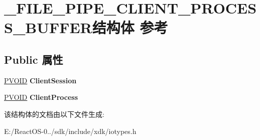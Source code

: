 \hypertarget{struct___f_i_l_e___p_i_p_e___c_l_i_e_n_t___p_r_o_c_e_s_s___b_u_f_f_e_r}{}\section{\+\_\+\+F\+I\+L\+E\+\_\+\+P\+I\+P\+E\+\_\+\+C\+L\+I\+E\+N\+T\+\_\+\+P\+R\+O\+C\+E\+S\+S\+\_\+\+B\+U\+F\+F\+E\+R结构体 参考}
\label{struct___f_i_l_e___p_i_p_e___c_l_i_e_n_t___p_r_o_c_e_s_s___b_u_f_f_e_r}
\subsection*{Public 属性}
\begin{DoxyCompactItemize}
\item 
\mbox{\label{struct___f_i_l_e___p_i_p_e___c_l_i_e_n_t___p_r_o_c_e_s_s___b_u_f_f_e_r_aab01e543040155032745100820a7c26e}} 
\hyperlink{interfacevoid}{P\+V\+O\+ID} {\bfseries Client\+Session}
\item 
\mbox{\label{struct___f_i_l_e___p_i_p_e___c_l_i_e_n_t___p_r_o_c_e_s_s___b_u_f_f_e_r_a389fd729e9ce317bd517ae3fd49ddd1f}} 
\hyperlink{interfacevoid}{P\+V\+O\+ID} {\bfseries Client\+Process}
\end{DoxyCompactItemize}


该结构体的文档由以下文件生成\+:\begin{DoxyCompactItemize}
\item 
E\+:/\+React\+O\+S-\/0../sdk/include/xdk/iotypes.\+h\end{DoxyCompactItemize}
